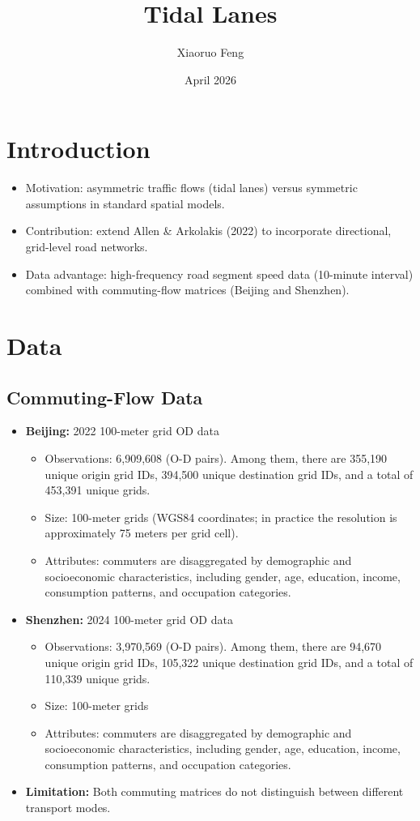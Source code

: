 \documentclass[12pt]{article}
\title{Tidal Lanes}
\author{Xiaoruo Feng}
\date{April 2026}
\begin{document}
	\maketitle
	
	\section{Introduction}
	\begin{itemize}
		\item Motivation: asymmetric traffic flows (tidal lanes) versus symmetric assumptions in standard spatial models.
		\item Contribution: extend Allen \& Arkolakis (2022) to incorporate directional, grid-level road networks.
		\item Data advantage: high-frequency road segment speed data (10-minute interval) combined with commuting-flow matrices (Beijing and Shenzhen).
	\end{itemize}
	
		\section{Data}
		\subsection{Commuting-Flow Data}
		
		\begin{itemize}
			\item \textbf{Beijing:} 2022 100-meter grid OD data
			\begin{itemize}
				\item Observations: 6,909,608 (O-D pairs). Among them, there are 355,190 unique origin grid IDs, 394,500 unique destination grid IDs, and a total of 453,391 unique grids.
				\item Size: 100-meter grids (WGS84 coordinates; in practice the resolution is approximately 75 meters per grid cell).
				\item Attributes: commuters are disaggregated by demographic and socioeconomic characteristics, including gender, age, education, income, consumption patterns, and occupation categories.
			\end{itemize}

			\item \textbf{Shenzhen:} 2024 100-meter grid OD data
			\begin{itemize}
				\item Observations: 3,970,569 (O-D pairs). Among them, there are 94,670 unique origin grid IDs, 105,322 unique destination grid IDs, and a total of 110,339 unique grids.
				\item Size: 100-meter grids
				\item Attributes: commuters are disaggregated by demographic and socioeconomic characteristics, including gender, age, education, income, consumption patterns, and occupation categories.
			\end{itemize}
				
		\item \textbf{Limitation:} Both commuting matrices do not distinguish between different transport modes.
	\end{itemize}
\end{document}
